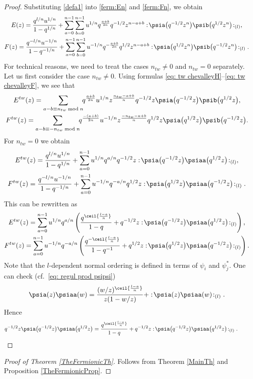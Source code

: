 \begin{proof}
Substituting \eqref{defa1} into \eqref{ferm:En} and \eqref{ferm:Fn}, we obtain
\begin{gather*}
E(z) = \frac{q^{l/n} u^{1/n} }{1-q^{1/n}} + \sum_{a=0}^{n-1} \sum_{b=0}^{n-1} u^{1/n} q^{\frac{a+b}{2n}} q^{-1/2} z^{n-a+b} : \! \psia \big( q^{-1/2} z^n\big) \psib \big(q^{1/2} z^n\big) \! :_{(l)}, \\
F(z) = \frac{q^{-l/n} u^{-1/n} }{1-q^{-1/n}} + \sum_{a=0}^{n-1} \sum_{b=0}^{n-1} u^{-1/n} q^{- \frac{a+b}{2n}} q^{1/2} z^{n-a+b} : \! \psia \big( q^{1/2} z^n \big) \psib \big(q^{-1/2} z^n \big)\!:_{(l)}.
\end{gather*}
For technical reasons, we need to treat the cases $n_{tw} \neq 0$ and $n_{tw} =0$ separately. Let us first consider the case $n_{tw} \neq 0$. Using formulas \eqref{eq: tw chevalleyH}--\eqref{eq: tw chevalleyF}, we see that
\begin{gather*}
E^{tw}(z) = \sum_{a-b \equiv n_{tw} \bmod n} \! \! q^{\frac{a+b}{2n}} u^{1/n} z^{\frac{n_{tw}-a+b}{n}} q^{-1/2} z \psia \big( q^{-1/2} z\big) \psib \big(q^{1/2} z\big), \\
F^{tw} (z) = \sum_{a-b \equiv -n_{tw} \bmod n} \! \!q^{\frac{-(a+b)}{2n}} u^{-1/n} z^{\frac{-n_{tw}-a+b}{n}} q^{1/2} z \psia \big( q^{1/2} z \big) \psib \big(q^{-1/2} z \big) .
\end{gather*}
For $n_{tw}=0$ we obtain
\begin{gather*}
E^{tw}(z) = \frac{q^{l/n} u^{1/n} }{1-q^{1/n}} + \sum_{a=0}^{n-1} u^{1/n} q^{a/n} q^{-1/2} z : \! \psia \big( q^{-1/2} z\big) \psiaa \big(q^{1/2} z\big) \! :_{(l)}, \\
F^{tw}(z) = \frac{q^{-l/n} u^{-1/n} }{1-q^{-1/n}} + \sum_{a=0}^{n-1} u^{-1/n} q^{-a/n} q^{1/2} z : \! \psia \big( q^{1/2} z \big) \psiaa \big(q^{-1/2} z \big)\!:_{(l)}.
\end{gather*}
This can be rewritten as
\begin{gather*}
E^{tw}(z) = \sum_{a=0}^{n-1} u^{1/n} q^{a/n} \left( \frac{q^{ \ceil{\frac{l-a}{n}} }}{1-q} +q^{-1/2} z : \! \psia \big( q^{-1/2} z\big) \psiaa \big(q^{1/2} z\big) \! :_{(l)} \right), \\
F^{tw}(z) = \sum_{a=0}^{n-1} u^{-1/n} q^{-a/n} \left( \frac{q^{- \ceil{\frac{l-a}{n}} }}{1-q^{-1}} + q^{1/2} z : \! \psia \big( q^{1/2} z \big) \psiaa \big(q^{-1/2} z \big)\!:_{(l)} \right) .
\end{gather*}
Note that the $l$-dependent normal ordering is defined in terms of $\psi_i$ and $\psi^*_j$. One can check (cf.~\eqref{eq: regul prod psipsi})
\begin{align} \label{eq: psia OPE}
\psia(z) \psiaa(w) = \frac{(w/z)^{\ceil{\frac{l-a}{n}} }}{z(1-w/z)} + : \! \psia (z) \psiaa (w) \! :_{(l)}.
\end{align}
Hence
\begin{equation*}
q^{-1/2} z \psia\big(q^{-1/2}z\big) \psiaa\big(q^{1/2}z\big) = \frac{q^{\ceil{\frac{l-a}{n}} }}{1-q} + q^{-1/2} z : \! \psia \big(q^{-1/2}z\big) \psiaa \big(q^{1/2}z\big) \! :_{(l)}.\tag*{\qed}
\end{equation*}\renewcommand{\qed}{}
\end{proof}

\begin{proof}[Proof of Theorem \ref{TheFermionicTh}] Follows from Theorem \ref{MainTh} and Proposition \ref{TheFermionicProp}.
\end{proof}
